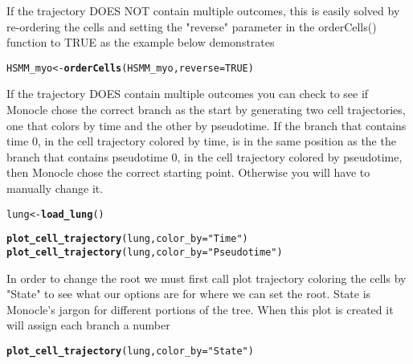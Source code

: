 \documentclass[10pt,oneside]{article}\usepackage[]{graphicx}\usepackage[]{color}
\makeatletter
\newcommand{\hlnum}[1]{\textcolor[rgb]{0.686,0.059,0.569}{#1}}%
\newcommand{\hlstr}[1]{\textcolor[rgb]{0.192,0.494,0.8}{#1}}%
\newcommand{\hlstd}[1]{\textcolor[rgb]{0.345,0.345,0.345}{#1}}%
\newcommand{\hlkwb}[1]{\textcolor[rgb]{0.69,0.353,0.396}{#1}}%
\newcommand{\hlkwc}[1]{\textcolor[rgb]{0.333,0.667,0.333}{#1}}%
\newcommand{\hlkwd}[1]{\textcolor[rgb]{0.737,0.353,0.396}{\textbf{#1}}}%
\newenvironment{kframe}{%
 \def\at@end@of@kframe{}%
 \ifinner\ifhmode%
  \def\at@end@of@kframe{\end{minipage}}%
  \begin{minipage}{\columnwidth}%
 \fi\fi%
 \def\FrameCommand##1{\hskip\@totalleftmargin \hskip-\fboxsep
 \colorbox{shadecolor}{##1}\hskip-\fboxsep
     \hskip-\linewidth \hskip-\@totalleftmargin \hskip\columnwidth}%
 \MakeFramed {\advance\hsize-\width
   \@totalleftmargin\z@ \linewidth\hsize
   \@setminipage}}%
 {\par\unskip\endMakeFramed%
 \at@end@of@kframe}
\newenvironment{knitrout}{}{} %
\makeatother
\begin{document}
\begin{enumerate}
 If the trajectory DOES NOT contain multiple outcomes, this is easily solved by re-ordering the cells and setting the "reverse" parameter in the orderCells() function to TRUE as the example below demonstrates
\begin{knitrout}
\color{fgcolor}\begin{kframe}
\begin{alltt}
\hlstd{HSMM_myo} \hlkwb{<-} \hlkwd{orderCells}\hlstd{(HSMM_myo,} \hlkwc{reverse} \hlstd{=} \hlnum{TRUE}\hlstd{)}
\end{alltt}
\end{kframe}
\end{knitrout}
 
 If the trajectory DOES contain multiple outcomes you can check to see if Monocle chose the correct branch as the start by generating two cell trajectories, one that colors by time and the other by pseudotime. If the branch that contains time 0, in the cell trajectory colored by time, is in the same position as the the branch that contains pseudotime 0, in the cell trajectory colored by pseudotime, then Monocle chose the correct starting point. Otherwise you will have to manually change it.   
\begin{knitrout}
\color{fgcolor}\begin{kframe}
\begin{alltt}
\hlstd{lung} \hlkwb{<-} \hlkwd{load_lung}\hlstd{()}

\hlkwd{plot_cell_trajectory}\hlstd{(lung,} \hlkwc{color_by} \hlstd{=} \hlstr{"Time"}\hlstd{)}
\hlkwd{plot_cell_trajectory}\hlstd{(lung,} \hlkwc{color_by} \hlstd{=} \hlstr{"Pseudotime"}\hlstd{)}
\end{alltt}
\end{kframe}
\end{knitrout}
 
 In order to change the root we must first call plot trajectory coloring the cells by "State" to see what our options are for where we can set the root. State is Monocle's jargon for different portions of the tree. When this plot is created it will assign each branch a number
\begin{knitrout}
\color{fgcolor}\begin{kframe}
\begin{alltt}
\hlkwd{plot_cell_trajectory}\hlstd{(lung,} \hlkwc{color_by} \hlstd{=} \hlstr{"State"}\hlstd{)}
\end{alltt}
\end{kframe}
\end{knitrout}
 

\end{enumerate}
\end{document}
